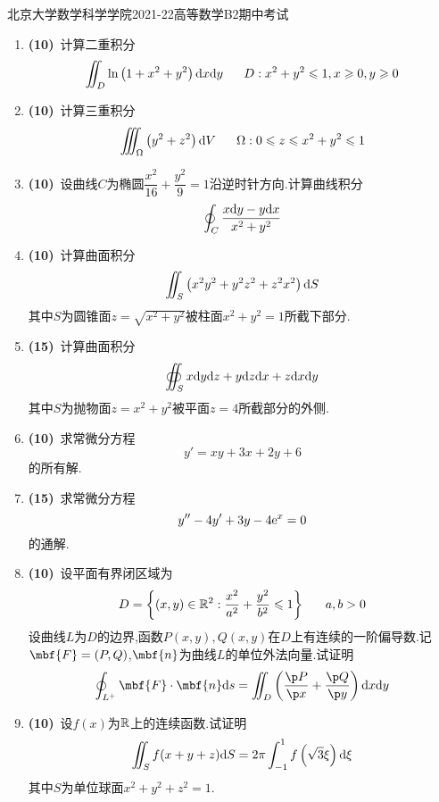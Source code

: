 \documentclass{ctexart}
\begin{document}
\pagestyle{empty}
\begin{center}\Large
    北京大学数学科学学院2021-22高等数学B2期中考试
\end{center}
\begin{enumerate}[leftmargin=*,label=\textbf{\arabic*.}]
    \item \textbf{(10)}\ 计算二重积分
        \[\iint_{D}\ln\left(1+x^2+y^2\right)\dx\di y\ \ \ \ \ D:x^2+y^2\leqslant1,x\geqslant0,y\geqslant0\]
    \item \textbf{(10)}\ 计算三重积分
        \[\iiint_{\Omega}\left(y^2+z^2\right)\di V\ \ \ \ \ \Omega:0\leqslant z\leqslant x^2+y^2\leqslant1\]
    \item \textbf{(10)}\ 设曲线$C$为椭圆$\dfrac{x^2}{16}+\dfrac{y^2}{9}=1$沿逆时针方向.计算曲线积分
        \[\oint_{C}\dfrac{x\mathrm{d} y-y\mathrm{d} x}{x^2+y^2}\]
    \item \textbf{(10)}\ 计算曲面积分
        \[\iint_{S}\left(x^2y^2+y^2z^2+z^2x^2\right)\mathrm{d} S\]
        其中$S$为圆锥面$z=\sqrt{x^2+y^2}$被柱面$x^2+y^2=1$所截下部分.
    \item \textbf{(15)}\ 计算曲面积分
        \[\oiint_Sx\mathrm{d} y\mathrm{d} z+y\mathrm{d} z\mathrm{d} x+z\mathrm{d} x\mathrm{d} y\]
        其中$S$为抛物面$z=x^2+y^2$被平面$z=4$所截部分的外侧.
    \item \textbf{(10)}\ 求常微分方程
        \[y'=xy+3x+2y+6\]
        的所有解.
    \item \textbf{(15)}\ 求常微分方程
        \[y''-4y'+3y-4\mathrm{e}^x=0\]
        的通解.
    \item \textbf{(10)}\ 设平面有界闭区域为
        \[D=\left\{(x,y)\in\R^2:\dfrac{x^2}{a^2}+\dfrac{y^2}{b^2}\leqslant1\right\}\ \ \ \ \ a,b>0\]
        设曲线$L$为$D$的边界,函数$P(x,y),Q(x,y)$在$D$上有连续的一阶偏导数.记$\mbf{F}=(P,Q)$,$\mbf{n}$为曲线$L$的单位外法向量.试证明
        \[\oint_{L^+}\mbf{F}\cdot\mbf{n}\di s=\iint_{D}\left(\dfrac{\p P}{\p x}+\dfrac{\p Q}{\p y}\right)\di x\di y\]
    \item \textbf{(10)}\ 设$f(x)$为$\mathbb{R}$上的连续函数.试证明
        \[\iint_{S}f(x+y+z)\mathrm{d} S=2\pi\int_{-1}^{1}f\left(\sqrt{3}\xi\right)\mathrm{d}\xi\]
        其中$S$为单位球面$x^2+y^2+z^2=1$.
\end{enumerate}
\end{document}
